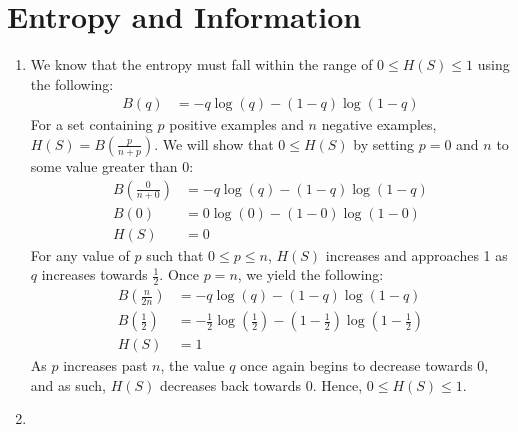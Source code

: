 \documentclass[11pt]{article}
\newcommand{\solution}[1]{{{\color{blue}{\bf Solution:} {#1}}}}
\begin{document}
\section{Entropy and Information}
\begin{enumerate}
\item
\solution{We know that the entropy must fall within the range of $0 \leq H(S) \leq 1$ using the following:
\begin{align}
B(q) &= -q\log(q) - (1-q)\log(1-q)
\end{align}
For a set containing $p$ positive examples and $n$ negative examples, $H(S) = B(\frac{p}{n+p})$. We will show that $0 \leq H(S)$ by setting $p=0$ and $n$ to some value greater than 0:
\begin{align}
B(\tfrac{0}{n+0}) &= -q\log(q) - (1-q)\log(1-q) \\
B(0) &= 0\log(0) - (1-0)\log(1-0) \\
H(S) &= 0
\end{align}
For any value of $p$ such that $0 \leq p \leq n$, $H(S)$ increases and approaches 1 as $q$ increases towards $\frac{1}{2}$. Once $p = n$, we yield the following: 
\begin{align}
B(\tfrac{n}{2n}) &= -q\log(q) - (1-q)\log(1-q) \\
B(\tfrac{1}{2}) &= -\tfrac{1}{2}\log(\tfrac{1}{2}) - (1-\tfrac{1}{2})\log(1-\tfrac{1}{2}) \\
H(S) &= 1
\end{align}
As $p$ increases past $n$, the value $q$ once again begins to decrease towards 0, and as such, $H(S)$ decreases back towards 0. Hence, $0 \leq H(S) \leq 1$.
}
\vspace{1cm}

\item
\solution{
}
\end{enumerate}
\end{document}

